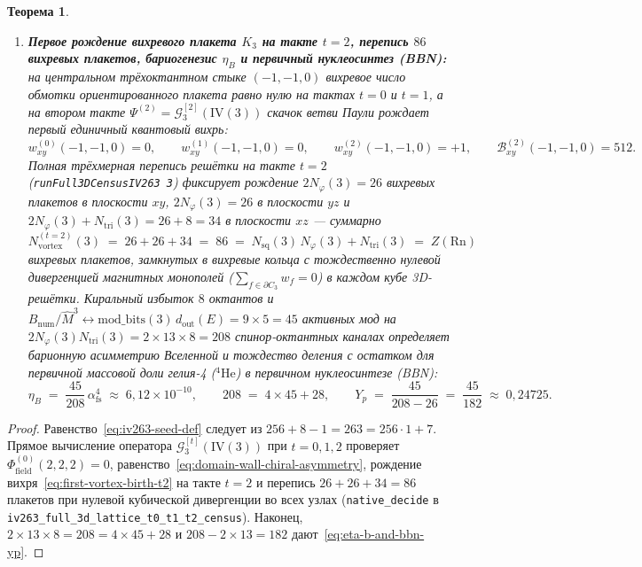 \documentclass[11pt,a4paper]{article}
\theoremstyle{plain}
\newtheorem{theorem}{Теорема}[section]
\theoremstyle{definition}
\begin{document}
\begin{theorem}
\begin{enumerate}[label=\textbf{(\arabic*)},leftmargin=*]
\item \textbf{Первое рождение вихревого плакета $K_3$ на такте $t = 2$, перепись $86$ вихревых плакетов, бариогенезис $\eta_B$ и первичный нуклеосинтез (BBN):}
  на центральном трёхоктантном стыке $(-1, -1, 0)$ вихревое число обмотки ориентированного плакета равно нулю на тактах $t = 0$ и $t = 1$, а на втором такте $\Psi^{(2)} = \mathcal{G}_3^{[2]}(\mathrm{IV}(3))$ скачок ветви Паули рождает первый единичный квантовый вихрь:
  \begin{equation}
    \label{eq:first-vortex-birth-t2}
    w_{xy}^{(0)}(-1,-1,0) = 0, \qquad
    w_{xy}^{(1)}(-1,-1,0) = 0, \qquad
    w_{xy}^{(2)}(-1,-1,0) = +1, \qquad
    \mathcal{B}_{xy}^{(2)}(-1,-1,0) = 512.
  \end{equation}
  Полная трёхмерная перепись решётки на такте $t = 2$ (\texttt{runFull3DCensusIV263 3}) фиксирует рождение $2 N_\varphi(3) = 26$ вихревых плакетов в плоскости $xy$, $2 N_\varphi(3) = 26$ в плоскости $yz$ и $2 N_\varphi(3) + N_{\mathrm{tri}}(3) = 26 + 8 = 34$ в плоскости $xz$ --- суммарно
  \begin{equation}
    \label{eq:t2-86-vortex-plaquettes}
    N_{\mathrm{vortex}}^{(t=2)}(3) \;=\; 26 + 26 + 34 \;=\; 86 \;=\; N_{\mathrm{sq}}(3)\,N_\varphi(3) + N_{\mathrm{tri}}(3) \;=\; Z(\mathrm{Rn})
  \end{equation}
  вихревых плакетов, замкнутых в вихревые кольца с тождественно нулевой дивергенцией магнитных монополей ($\sum_{f\in\partial C_3} w_f = 0$) в каждом кубе 3D-решётки. Киральный избыток $8$ октантов и $B_{\mathrm{num}}/\widehat{M}^3 \leftrightarrow \mathrm{mod\_bits}(3)\,d_{\mathrm{out}}(E) = 9\times 5 = 45$ активных мод на $2 N_\varphi(3) N_{\mathrm{tri}}(3) = 2\times 13\times 8 = 208$ спинор-октантных каналах определяет барионную асимметрию Вселенной и тождество деления с остатком для первичной массовой доли гелия-4 ($^4\mathrm{He}$) в первичном нуклеосинтезе (BBN):
  \begin{equation}
    \label{eq:eta-b-and-bbn-yp}
    \eta_B \;=\; \frac{45}{208}\,\alpha_{\mathrm{fs}}^4 \;\approx\; 6{,}12\times 10^{-10}, \qquad
    208 \;=\; 4 \times 45 + 28, \qquad
    Y_p \;=\; \frac{45}{208 - 26} \;=\; \frac{45}{182} \;\approx\; 0{,}24725.
  \end{equation}
\end{enumerate}
\end{theorem}

\begin{proof}
Равенство~\eqref{eq:iv263-seed-def} следует из $256 + 8 - 1 = 263 = 256\cdot 1 + 7$. Прямое вычисление оператора $\mathcal{G}_3^{[t]}(\mathrm{IV}(3))$ при $t = 0, 1, 2$ проверяет $\Phi_{\mathrm{field}}^{(0)}(2,2,2) = 0$, равенство~\eqref{eq:domain-wall-chiral-asymmetry}, рождение вихря~\eqref{eq:first-vortex-birth-t2} на такте $t = 2$ и перепись $26 + 26 + 34 = 86$ плакетов при нулевой кубической дивергенции во всех узлах (\texttt{native\_decide} в \texttt{iv263\_full\_3d\_lattice\_t0\_t1\_t2\_census}). Наконец, $2\times 13\times 8 = 208 = 4\times 45 + 28$ и $208 - 2\times 13 = 182$ дают~\eqref{eq:eta-b-and-bbn-yp}.
\end{proof}
\end{document}
